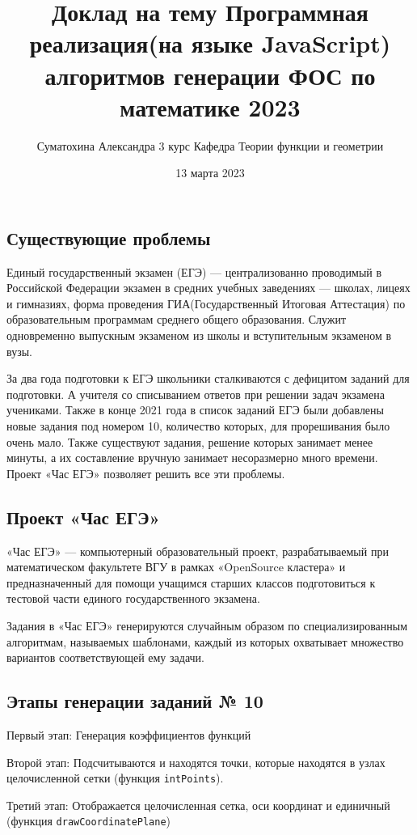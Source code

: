 \documentclass[a4paper, 12pt]{extarticle}
\title{Доклад на тему Программная реализация(на языке JavaScript) алгоритмов генерации ФОС по математике 2023}
\author{Суматохина Александра 3 курс Кафедра Теории функции и геометрии}
\date{13 марта 2023}
\begin{document}
    \maketitle
\subsection*{Существующие проблемы}
Единый государственный экзамен (ЕГЭ) — централизованно проводимый в Российской Федерации экзамен в средних учебных заведениях — школах, лицеях и гимназиях, форма проведения ГИА(Государственный Итоговая Аттестация) по образовательным программам среднего общего образования. 
Служит одновременно выпускным экзаменом из школы и вступительным экзаменом в вузы.

За два года подготовки к ЕГЭ школьники сталкиваются с дефицитом заданий для подготовки.
А учителя со списыванием ответов при решении задач экзамена учениками. 
Также в конце 2021 года в список заданий ЕГЭ были добавлены новые задания под номером 10, 
количество которых, для прорешивания было очень мало. 
Также существуют задания, решение которых занимает менее минуты, а их составление вручную занимает несоразмерно много времени. 
Проект «Час ЕГЭ» позволяет решить все эти проблемы.

\subsection*{Проект «Час ЕГЭ»}
«Час ЕГЭ» — компьютерный образовательный проект, разрабатываемый при математическом 
факультете ВГУ в рамках «OpenSource кластера» и предназначенный для помощи учащимся 
старших классов подготовиться к тестовой части единого государственного экзамена.

Задания в «Час ЕГЭ» генерируются случайным образом по специализированным алгоритмам, называемых шаблонами, каждый из которых охватывает множество вариантов соответствующей ему задачи. 

\subsection*{Этапы генерации заданий № 10}

Первый этап: Генерация коэффициентов функций

Второй этап: Подсчитываются и находятся точки, которые находятся в узлах целочисленной сетки (функция \texttt{intPoints}).

Третий этап: Отображается целочисленная сетка, оси координат и единичный  (функция \texttt{drawCoordinatePlane})
\end{document}
